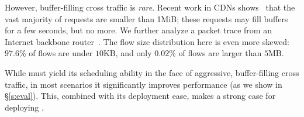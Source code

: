 However, buffer-filling cross traffic is \emph{rare}.
Recent work in CDNs shows~\cite{akamai-cdn-trace} that the vast majority of requests are smaller than 1MiB; these requests may fill buffers for a few seconds, but no more.
We further analyze a packet trace from an Internet backbone router~\cite{caida-dataset}.
The flow size distribution here is even more skewed: $97.6\%$ of flows are under $10$KB, and only $0.02\%$ of flows are larger than $5$MB.

\vspace{0.05in}
 While \name must yield its scheduling ability in the face of aggressive, buffer-filling cross traffic, in most scenarios it significantly improves performance (as we show in \S\ref{s:eval}).
This, combined with its deployment ease, makes a strong case for deploying \name. 
